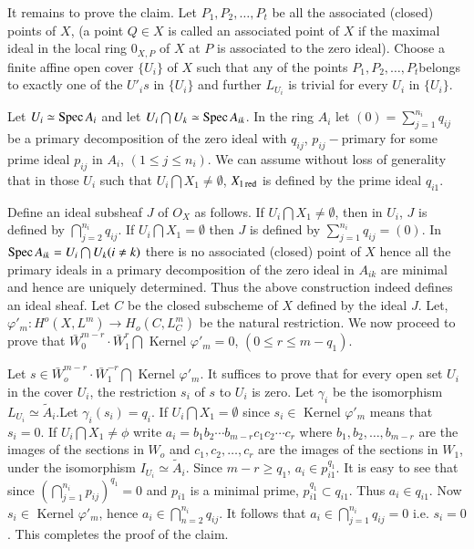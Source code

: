 It remains to prove the claim. Let $P_1, P_2, \ldots , P_t$ be all the
associated (closed) points of $X$, (a point $Q \in X $ is
called an associated point of $X$ if the maximal ideal in the local
ring $0_{X, P}$ of $X$ at $P$ is associated to the zero ideal). Choose a
finite affine open cover $\{ U_i \}$ of $X$ such that any of the
points $P_1, P_2, \ldots , P_t$\pageoriginale belongs to exactly one
of the $U'_i s 
$ in $\{ U_i \}$ and further $L_{U_i} $ is trivial for every $U_i$ in
$\{ U_i \}$. 
   
Let $U_i \simeq \operatorname{Spec} A_i$ and let $U_i \bigcap U_k \simeq \operatorname{Spec}
A_{ik}$. In the ring $A_i$ let $(0) = \sum\limits^{n_i}_{j = 1}
q_{ij}$ be a primary decomposition of the zero ideal with $q_{ij}$,
$p_{ij}-$primary for some prime ideal $p_{ij}$ in $A_i$, $(1 \le j \le
n_i)$. We can assume without loss of generality that in those $U_i$
such that $U_i \bigcap X_1 \neq \emptyset$, $X_{\rm 1\operatorname{red}}$  is defined by the
prime ideal $q_{i1}$. 

Define an ideal subsheaf $J$ of $O_X$ as follows. If $U_i \bigcap
X_1 \neq \emptyset$, then in $U_i$, $J$ is defined by $\bigcap\limits_{j =
  2}^{n_i} q_{ij}$. If $U_i \bigcap X_1 = \emptyset$ then $J$ is defined
by $\sum\limits^{n_i}_{j = 1} q_{ij} = (0)$. In $\operatorname{Spec} A_{ik}= U_i
\bigcap U_k (i \neq k)$ there is no associated (closed) point of $X$
hence all the primary ideals in a primary decomposition of the zero
ideal in $A_{ik}$ are minimal and hence are uniquely determined. Thus
the above construction indeed defines an ideal sheaf. Let $C$ be the
closed subscheme of $X$ defined by the ideal $J$. Let, $\varphi'_m
: H^o (X, L^m) \to H_o (C, L^m_C)$ be the natural restriction. We now
proceed to prove that $\bar{W}^{m-r}_{0}\cdot \bar{W}^{r}_1 \bigcap $
Kernel $\varphi'_m = 0$, $(0 \le r \le m-q_1)$. 

Let $s \in \bar{W}^{m-r}_o \cdot \bar{W}^{-r}_1 \bigcap$ Kernel
$\varphi'_m$. It suffices to prove that for every open set $U_i$ in
the cover $U_i$, the restriction $s_i$ of $s$ to $U_i$ is zero. Let
$\gamma_i$ be the isomorphism $L_{U_i} \simeq
\tilde{A}_i$.\pageoriginale Let 
$\gamma_i(s_i) = q_i$. If $U_i \bigcap X_1 = \emptyset$ since $s_i
\in$ Kernel $\varphi'_m$ means that $s_i = 0$. If $U_i
\bigcap X_1 \neq \phi$ write $a_i = b_1 b_2 \cdots b_{m-r} c_1c_2
\cdots c_r$ where $b_1, b_2, \ldots , b_{m-r}$ are the images of the
sections in $W_o$ and $c_1, c_2, \ldots , c_r$ are the images of the
sections in $W_1$, under the isomorphism $I_{U_i} \simeq
\tilde{A}_i$. Since $m - r \ge q_1$, $a_i \in
p^{q_1}_{i1}$. It is easy to see that since $(\bigcap\limits^{n_i}_{j
  = 1} p_{ij})^{q_1}= 0$ and $p_{i1}$ is a minimal prime,
$p^{q_1}_{i1} \subset q_{i1}$. Thus $a_i \in q_{i1}$. Now $s_i
\in$ Kernel $\varphi'_m$, hence  $a_i \in \bigcap\limits_{n  =
  2}^{n_i} q_{ij}$. It follows that $a_i \in
\bigcap\limits^{n_i}_{j = 1}q_{ij} = 0$ i.e. $s_i = 0$. This completes
the proof of the claim. 

